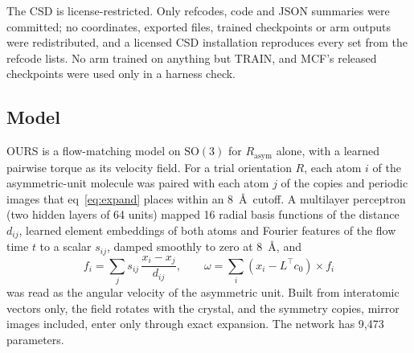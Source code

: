 The CSD is license-restricted. Only refcodes, code and JSON summaries were
committed; no coordinates, exported files, trained checkpoints or arm outputs
were redistributed, and a licensed CSD installation reproduces every set from the
refcode lists. No arm trained on anything but TRAIN, and MCF's released
checkpoints were used only in a harness check.

\subsection{Model}

OURS is a flow-matching model\cite{lipman2023flowmatching,chen2024riemannian} on
$\mathrm{SO}(3)$ for $R_{\mathrm{asym}}$ alone, with a learned pairwise torque as
its velocity field. For a trial orientation $R$, each atom $i$ of the
asymmetric-unit molecule was paired with each atom $j$ of the copies and periodic
images that eq~\ref{eq:expand} places within an 8~\AA\ cutoff. A
multilayer perceptron (two hidden layers of 64 units) mapped 16 radial basis
functions of the distance $d_{ij}$, learned element embeddings of both atoms and
Fourier features of the flow time $t$ to a scalar $s_{ij}$, damped smoothly to zero
at 8~\AA, and
\begin{equation}
f_i=\sum_j s_{ij}\,\frac{x_i-x_j}{d_{ij}},\qquad
\omega=\sum_i (x_i-L^{\top}c_0)\times f_i
\end{equation}
was read as the angular velocity of the asymmetric unit. Built from interatomic
vectors only, the field rotates with the crystal, and the symmetry copies, mirror
images included, enter only through exact expansion. The network has 9,473
parameters.

